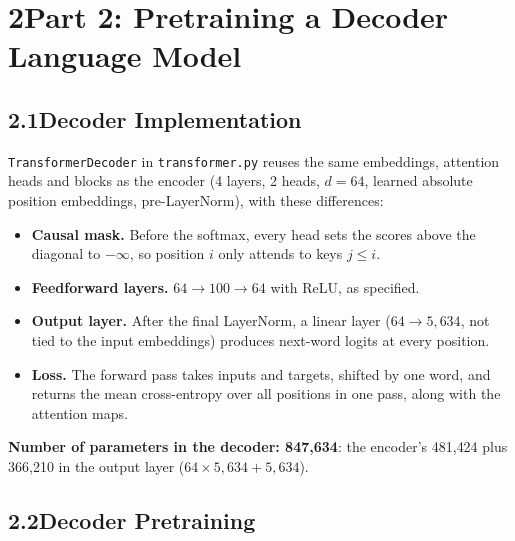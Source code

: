 \documentclass[11pt]{article}
\newcommand{\code}[1]{\texttt{#1}}
\begin{document}
\section*{2\quad Part 2: Pretraining a Decoder Language Model}

\subsection*{2.1\quad Decoder Implementation}

\code{TransformerDecoder} in \code{transformer.py} reuses the same embeddings, attention heads and blocks as the encoder (4 layers, 2 heads, $d = 64$, learned absolute position embeddings, pre-LayerNorm), with these differences:
\begin{itemize}
  \item \textbf{Causal mask.} Before the softmax, every head sets the scores above the diagonal to $-\infty$, so position $i$ only attends to keys $j \le i$.
  \item \textbf{Feedforward layers.} $64 \rightarrow 100 \rightarrow 64$ with ReLU, as specified.
  \item \textbf{Output layer.} After the final LayerNorm, a linear layer ($64 \rightarrow 5{,}634$, not tied to the input embeddings) produces next-word logits at every position.
  \item \textbf{Loss.} The forward pass takes inputs and targets, shifted by one word, and returns the mean cross-entropy over all positions in one pass, along with the attention maps.
\end{itemize}
\textbf{Number of parameters in the decoder: 847{,}634}: the encoder's 481{,}424 plus 366{,}210 in the output layer ($64 \times 5{,}634 + 5{,}634$).

\subsection*{2.2\quad Decoder Pretraining}
\end{document}
